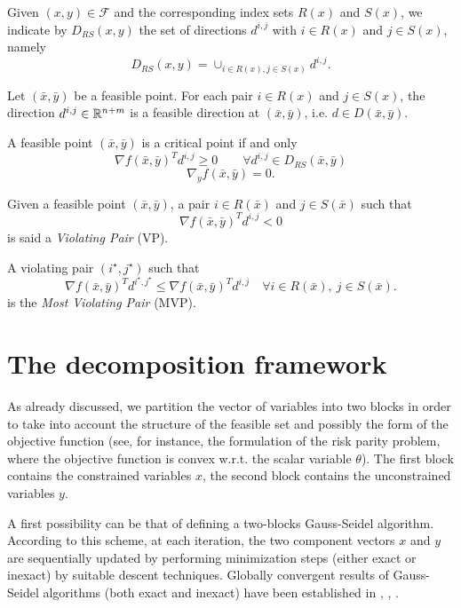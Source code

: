 Given $(x, y) \in \mathcal{F}$ and the corresponding index sets $R(x)$ and $S(x)$, we indicate by $D_{RS}(x,y)$
the set of directions $d^{i,j}$ with $i \in R(x)$ and $j \in S(x)$, namely
$$
D_{RS}(x,y)=\cup_{i\in R(x),j\in S(x)}d^{i,j}.
$$
\begin{proposition}\label{3.1}
Let $(\bar x,\bar y)$ be a feasible point. For each pair $i \in R(x)$ and $j \in S(x)$, the
direction $d^{i,j}\in \mathbb{R}^{n+m}$ is a feasible direction at $(\bar x,\bar y)$, i.e. $d \in D(\bar x,\bar y)$.
\end{proposition}
\begin{proposition}\label{3.2}
A feasible point $(\bar x,\bar y)$
 is a critical point if and only
\begin{equation}\label{on_x2}
\nabla f(\bar x,\bar y)^Td^{i,j}\ge 0\quad\quad \forall d^{i,j}\in D_{RS}(\bar x,\bar y)
\end{equation}
\begin{equation}\label{on_y3}
 \nabla_y f(\bar x,\bar y)=0.
\end{equation} 
\end{proposition}
Given a feasible point $(\bar x,\bar y)$, a pair $i\in R(\bar x)$ and $j\in S(\bar x)$ such that
$$
\nabla f(\bar x,\bar y)^Td^{i,j}<0
$$
is said a {\it Violating Pair} (VP).

A violating pair $(i^\star,j^\star)$ such that 
\begin{equation}\label{mvp}
 \nabla f(\bar x,\bar y)^Td^{i^\star,j^\star}\le \nabla f(\bar x,\bar y)^Td^{i,j} \quad \forall i\in R(\bar x), \ j\in S(\bar x).
\end{equation}
is the {\it Most Violating Pair} (MVP).

\section{The decomposition framework}
As already discussed, we partition the vector of variables into two blocks in order to take into account
the structure of the feasible set and possibly the form of the objective function (see, for instance,
the formulation of the risk parity problem, where the objective function is convex w.r.t. the scalar variable $\theta$).
The first block contains the constrained variables $x$, the second block contains
the unconstrained variables $y$. 

A first possibility can be that of defining a two-blocks Gauss-Seidel algorithm.
According to this scheme, at each iteration, the two component vectors $x$ and $y$ are
sequentially updated by performing  minimization steps (either exact or inexact) by  suitable descent techniques.
Globally convergent results of Gauss-Seidel algorithms (both exact and inexact) have been established in \cite{}, \cite{}, \cite{}.

